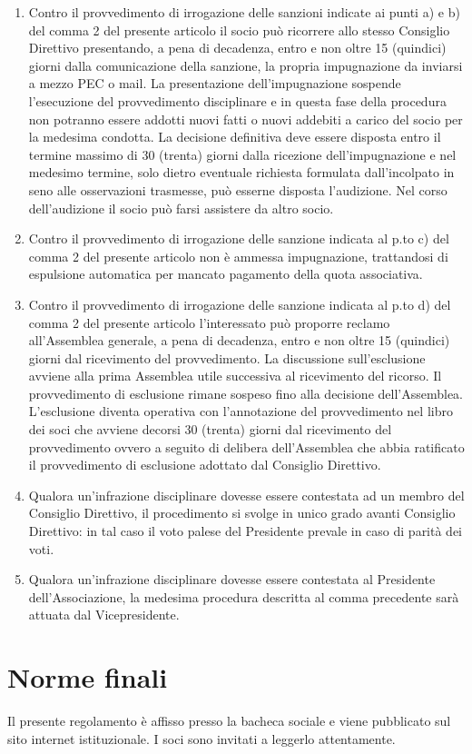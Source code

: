 \documentclass{djtsasddoc}
\begin{document}
\begin{enumerate}
		\item Contro il provvedimento di irrogazione delle sanzioni indicate ai punti a) e b) del comma 2 del presente articolo il socio può ricorrere allo stesso Consiglio Direttivo presentando, a pena di decadenza, entro e non oltre 15 (quindici) giorni  dalla comunicazione della sanzione, la propria impugnazione da inviarsi a mezzo PEC o mail. La presentazione dell'impugnazione sospende l'esecuzione del provvedimento disciplinare e in questa fase della procedura non potranno essere addotti nuovi fatti o nuovi addebiti a carico del socio per la medesima condotta. La decisione definitiva deve essere disposta entro il termine massimo di 30 (trenta) giorni dalla ricezione dell'impugnazione e nel medesimo termine, solo dietro eventuale richiesta formulata dall'incolpato in seno alle osservazioni trasmesse, può esserne disposta l'audizione. Nel corso dell'audizione il socio può farsi assistere da altro socio.
		\item Contro il provvedimento di irrogazione delle sanzione indicata al p.to c) del comma 2 del presente articolo  non è ammessa impugnazione, trattandosi di espulsione automatica per mancato pagamento della quota associativa.
		\item Contro il provvedimento di irrogazione delle sanzione indicata al p.to d) del comma 2 del presente articolo l'interessato può proporre reclamo all'Assemblea generale, a pena di decadenza, entro e non oltre 15 (quindici) giorni dal ricevimento del provvedimento. La discussione sull'esclusione avviene alla prima Assemblea utile successiva al ricevimento del ricorso. Il provvedimento di esclusione rimane sospeso fino alla decisione dell'Assemblea. L'esclusione diventa operativa con l'annotazione del provvedimento nel libro dei soci che avviene decorsi  30 (trenta) giorni dal ricevimento del provvedimento ovvero a seguito di delibera dell'Assemblea che abbia ratificato il provvedimento di esclusione adottato dal Consiglio Direttivo.
		\item Qualora un'infrazione disciplinare dovesse essere contestata ad un membro del Consiglio Direttivo, il procedimento si svolge in unico grado avanti Consiglio Direttivo: in tal caso il voto palese del Presidente prevale in caso di parità dei voti.
		\item Qualora un'infrazione disciplinare dovesse essere contestata al Presidente dell'Associazione, la medesima procedura descritta al comma precedente sarà attuata dal Vicepresidente.
	\end{enumerate}
	
	\section*{Norme finali}
	Il presente regolamento è affisso presso la bacheca sociale e viene pubblicato sul sito internet istituzionale. I soci sono invitati a leggerlo attentamente.
	
\end{document}
